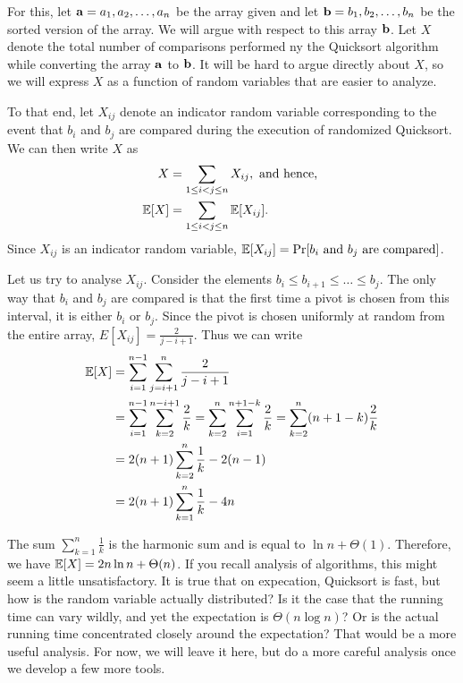 For this, let $\mathbf{a} = a_1, a_2, \ldots, a_n$ be the array given and let $\mathbf{b} = b_1, b_2, \ldots, b_n$ be the sorted version of the array. We will argue with respect to this array $\mathbf{b}$. Let $X$ denote the total number of comparisons performed ny the Quicksort algorithm while converting the array $\mathbf{a}$ to $\mathbf{b}$. It will be hard to argue directly about $X$, so we will express $X$ as a function of random variables that are easier to analyze. 

To that end, let $X_{ij}$ denote an indicator random variable corresponding to the event that $b_i$ and $b_j$ are compared during the execution of randomized Quicksort. We can then write $X$ as
\begin{align*}
	X &= \sum_{1\leq i<j\leq n} X_{ij}, \text{ and hence, }\\
	\mathbb{E}[X] &= \sum_{1\leq i<j\leq n} \mathbb{E}[X_{ij}].
\end{align*} 
Since $X_{ij}$ is an indicator random variable, $\mathbb{E}[X_{ij}] = \Pr[\text{$b_i$ and $b_j$ are compared}]$. 

Let us try to analyse $X_{ij}$. Consider the elements $b_i \leq b_{i+1} \leq \ldots \leq b_j$. The only way that $b_i$ and $b_j$ are compared is that the first time a pivot is chosen from this interval, it is either $b_i$ or $b_j$. Since the pivot is chosen uniformly at random from the entire array, $E[X_{ij}] = \tfrac{2}{j-i+1}$. Thus we can write
\begin{align*}
	\mathbb{E}[X] &= \sum_{i=1}^{n-1} \sum_{j=i+1}^n \frac{2}{j-i+1}\\
	&= \sum_{i=1}^{n-1} \sum_{k=2}^{n-i+1}\frac{2}{k} = \sum_{k=2}^n \sum_{i=1}^{n+1-k} \frac{2}{k} = \sum_{k=2}^n (n+1-k)\frac{2}{k}\\
	&= 2(n+1)\sum_{k=2}^n \frac{1}{k} - 2(n-1)\\
	&= 2(n+1)\sum_{k=1}^n \frac{1}{k} - 4n
\end{align*}

The sum $\sum_{k=1}^n \frac{1}{k}$ is the harmonic sum and is equal to $\ln n +\Theta(1)$. Therefore, we have $\mathbb{E}[X] = 2n\ln n + \Theta(n)$. If you recall analysis of algorithms, this might seem a little unsatisfactory. It is true that on expecation, Quicksort is fast, but how is the random variable actually distributed? Is it the case that the running time can vary wildly, and yet the expectation is $\Theta(n\log n)$? Or is the actual running time concentrated closely around the expectation? That would be a more useful analysis. For now, we will leave it here, but do a more careful analysis once we develop a few more tools.

